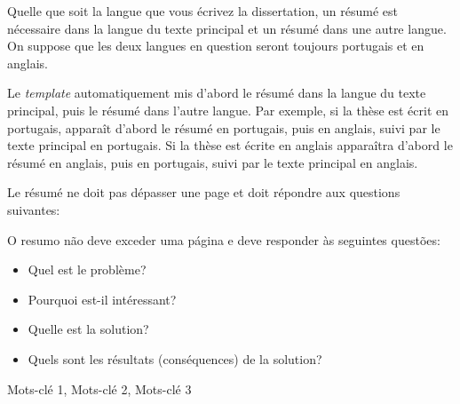 
%

Quelle que soit la langue que vous écrivez la dissertation, un résumé est nécessaire dans la langue du texte principal et un résumé dans une autre langue. On suppose que les deux langues en question seront toujours portugais et en anglais.

Le \emph{template} automatiquement mis d'abord le résumé dans la langue du texte principal, puis le résumé dans l'autre langue. Par exemple, si la thèse est écrit en portugais, apparaît d'abord le résumé en portugais, puis en anglais, suivi par le texte principal en portugais. Si la thèse est écrite en anglais apparaîtra d'abord le résumé en anglais, puis en portugais, suivi par le texte principal en anglais.

Le résumé ne doit pas dépasser une page et doit répondre aux questions suivantes:

O resumo não deve exceder uma página e deve responder às seguintes questões:
\begin{itemize}
  \item Quel est le problème?
  \item Pourquoi est-il intéressant?
  \item Quelle est la solution?
  \item Quels sont les résultats (conséquences) de la solution?
\end{itemize}

\begin{keywords}
Mots-clé 1, Mots-clé 2, Mots-clé 3
\end{keywords}
